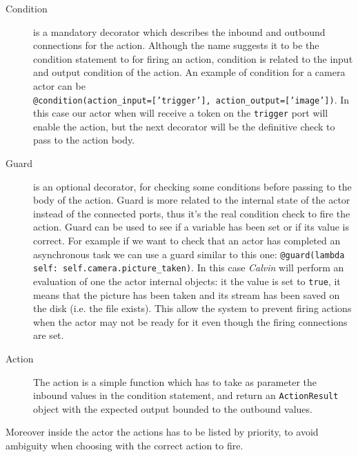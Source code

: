 \begin{description}
    \item[Condition] is a mandatory decorator which describes the inbound and outbound connections for the action.
    Although the name suggests it to be the condition statement to for firing an action, condition is related to the
    input and output condition of the action. An example of condition for a camera actor can be \\
    \texttt{@condition(action\_input=['trigger'], action\_output=['image'])}. In this case our actor when will receive a token
    on the \texttt{trigger} port will enable the action, but the next decorator will be the definitive check to pass to the action
    body.
    \item[Guard]  is an optional decorator, for checking some conditions before passing to the body of the action.
    Guard is more related to the internal state of the actor instead of the connected ports, thus it's the real condition
    check to fire the action. Guard can be used to see if a variable has been set or if its value is correct. For example
    if we want to check that an actor has completed an asynchronous task we can use a guard similar to this one:
    \texttt{@guard(lambda self: self.camera.picture\_taken)}. In this case \textit{Calvin} will perform an evaluation
    of one the actor internal objects: it the value is set to \texttt{true}, it means that the picture has been taken and
    its stream has been saved on the disk (i.e. the file exists). This allow the system to prevent firing actions
    when the actor may not be ready for it even though the firing connections are set.
    \item[Action] The action is a simple function which has to take as parameter the inbound values in the condition
    statement, and return an \texttt{ActionResult} object with the expected output bounded to the outbound values.

\end{description}

Moreover inside the actor the actions has to be listed by priority, to avoid ambiguity
when choosing with the correct action to fire.
